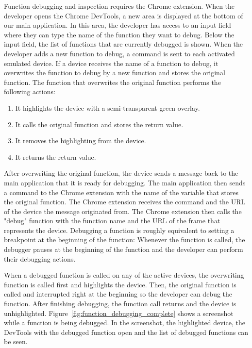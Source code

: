 Function debugging and inspection requires the Chrome extension. When the developer opens the Chrome DevTools, a new area is displayed at the bottom of our main application. In this area, the developer has access to an input field where they can type the name of the function they want to debug.  Below the input field, the list of functions that are currently debugged is shown. When the developer adds a new function to debug, a command is sent to each activated emulated device. If a device receives the name of a function to debug, it overwrites the function to debug by a new function and stores the original function. The function that overwrites the original function performs the following actions:
\begin{enumerate}
	\item It highlights the device with a semi-transparent green overlay.
	\item It calls the original function and stores the return value.
	\item It removes the highlighting from the device.
	\item It returns the return value.
\end{enumerate}
After overwriting the original function, the device sends a message back to the main application that it is ready for debugging. The main application then sends a command to the Chrome extension with the name of the variable that stores the original function. The Chrome extension receives the command and the URL of the device the message originated from. The Chrome extension then calls the "debug" function with the function name and the URL of the frame that represents the device. Debugging a function is roughly equivalent to setting a breakpoint at the beginning of the function: Whenever the function is called, the debugger pauses at the beginning of the function and the developer can perform their debugging actions.

When a debugged function is called on any of the active devices, the overwriting function is called first and highlights the device. Then, the original function is called and interrupted right at the beginning so the developer can debug the function. After finishing debugging, the function call returns and the device is unhighlighted. Figure~\ref{fig:function_debugging_complete} shows a screenshot while a function is being debugged. In the screenshot, the highlighted device, the DevTools with the debugged function open and the list of debugged functions can be seen.

